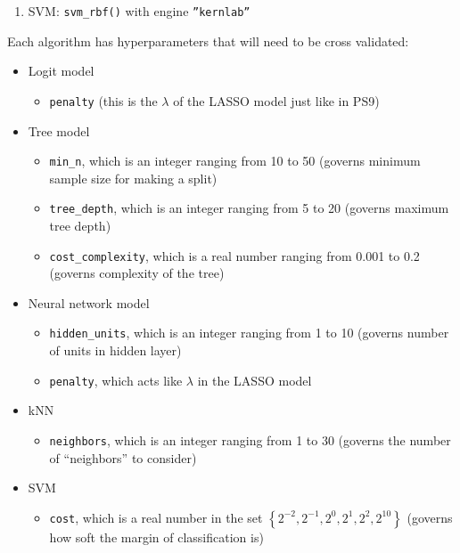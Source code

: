 \documentclass[12pt,english]{exam}
\begin{document}
\begin{questions}
\begin{itemize}
\begin{enumerate}
    \item SVM: \texttt{svm\_rbf()} with engine \texttt{''kernlab''}       
    \end{enumerate}
\end{itemize}
\question Each algorithm has hyperparameters that will need to be cross validated:
\begin{itemize}
\item Logit model 
    \begin{itemize}
    \item \texttt{penalty} (this is the $\lambda$ of the LASSO model just like in PS9)
    \end{itemize}
\item Tree model
    \begin{itemize}
    \item \texttt{min\_n}, which is an integer ranging from 10 to 50 (governs minimum sample size for making a split)
    \item \texttt{tree\_depth}, which is an integer ranging from 5 to 20 (governs maximum tree depth)
    \item \texttt{cost\_complexity}, which is a real number ranging from 0.001 to 0.2 (governs complexity of the tree)
    \end{itemize}
\item Neural network model
    \begin{itemize}
    \item \texttt{hidden\_units}, which is an integer ranging from 1 to 10 (governs number of units in hidden layer)
    \item \texttt{penalty}, which acts like $\lambda$ in the LASSO model
    \end{itemize}
\item kNN
    \begin{itemize}
    \item \texttt{neighbors}, which is an integer ranging from 1 to 30 (governs the number of ``neighbors'' to consider)
    \end{itemize}
\item SVM
    \begin{itemize}
    \item \texttt{cost}, which is a real number in the set $\left\{2^{-2},2^{-1},2^{0},2^{1},2^{2},2^{10}\right\}$ (governs how soft the margin of classification is)

\end{itemize}
\end{itemize}
\end{questions}
\end{document}
